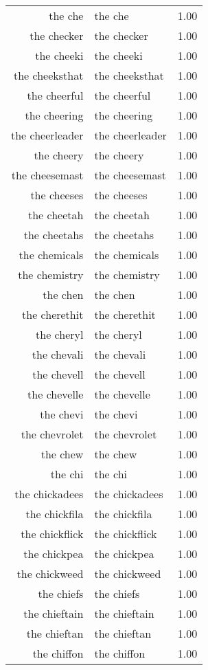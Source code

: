 \begin{table}[ht]
\begin{tabular}{rlr}
  the che & the che & 1.00 \\ 
  the checker & the checker & 1.00 \\ 
  the cheeki & the cheeki & 1.00 \\ 
  the cheeksthat & the cheeksthat & 1.00 \\ 
  the cheerful & the cheerful & 1.00 \\ 
  the cheering & the cheering & 1.00 \\ 
  the cheerleader & the cheerleader & 1.00 \\ 
  the cheery & the cheery & 1.00 \\ 
  the cheesemast & the cheesemast & 1.00 \\ 
  the cheeses & the cheeses & 1.00 \\ 
  the cheetah & the cheetah & 1.00 \\ 
  the cheetahs & the cheetahs & 1.00 \\ 
  the chemicals & the chemicals & 1.00 \\ 
  the chemistry & the chemistry & 1.00 \\ 
  the chen & the chen & 1.00 \\ 
  the cherethit & the cherethit & 1.00 \\ 
  the cheryl & the cheryl & 1.00 \\ 
  the chevali & the chevali & 1.00 \\ 
  the chevell & the chevell & 1.00 \\ 
  the chevelle & the chevelle & 1.00 \\ 
  the chevi & the chevi & 1.00 \\ 
  the chevrolet & the chevrolet & 1.00 \\ 
  the chew & the chew & 1.00 \\ 
  the chi & the chi & 1.00 \\ 
  the chickadees & the chickadees & 1.00 \\ 
  the chickfila & the chickfila & 1.00 \\ 
  the chickflick & the chickflick & 1.00 \\ 
  the chickpea & the chickpea & 1.00 \\ 
  the chickweed & the chickweed & 1.00 \\ 
  the chiefs & the chiefs & 1.00 \\ 
  the chieftain & the chieftain & 1.00 \\ 
  the chieftan & the chieftan & 1.00 \\ 
  the chiffon & the chiffon & 1.00 \\ 

\end{tabular}
\end{table}
